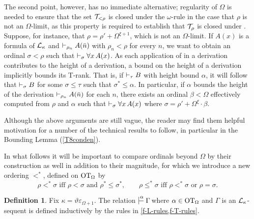 \documentclass[UKenglish,cleveref,DIV=12]{scrartcl}
\theoremstyle{definition}
\newtheorem{definition}[lemma]{Definition}
\theoremstyle{definition}
\begin{document}
The second point, however, has no immediate alternative; regularity
of $\Omega$ is needed to ensure that the set $\mathcal{T}_{<\rho}$ is closed under the $\omega$-rule
in the case that $\rho$ is not an $\Omega$-limit, as this property is required to establish that
$\mathcal{T}_\rho$ is closed under \Conec\eta. 
Suppose, for instance, that 
$\rho=\rho'+\Omega^{\xi+1}$, which is not an $\Omega$-limit. 
If $A(x)$ is a formula of
$\mathcal{L}_\kappa$ and $\vdash_{\rho_n}  A(\bar n)$ with $\rho_n<\rho$ for every
$n$, we want to obtain an ordinal $\sigma<\rho$ such that
$\vdash_\sigma \forall x\, A(x)$.
%
As each application of \Nec\eta{} in a derivation contributes to the height of a
derivation, a bound on the height of a derivation implicitly bounds its T-rank.
That is, if $\vdash_\tau  B$ with height bound $\alpha$, it will follow that 
$\vdash_{\sigma}  B$ for some \( \sigma \le \tau \) such that $\sigma^* \le \alpha $.
In particular, if $\alpha$ bounds the height of the derivation $\vdash_{\rho_n}  A(\bar n)$ for each
$n$, there exists an ordinal \( \beta < \Omega \) effectively computed from \( \rho \) and \( \alpha \)
such that 
$\vdash_\sigma  \forall x\,A(x)$ where 
$\sigma=\rho'+\Omega^\xi\cdot\beta$.

Although the above arguments are still vague, the reader may find them helpful motivation for a number of the technical results to follow, in particular in the Bounding Lemma (\cref{T8conden}).

In what follows it will be important to compare ordinals beyond $\Omega$ by their construction as well in addition to their magnitude, for which we introduce a new ordering $<^*$, defined on $\mathrm{OT}_\Omega$ by
\[
  \rho<^*\sigma \text{ iff }\rho<\sigma \text{ and }\rho^*\le\sigma^*,
  \qquad
  \rho\le^*\sigma \text{ iff } \rho<^*\sigma \text{ or }\rho=\sigma.
\]

\begin{definition}%
Fix $\kappa=\vartheta\varepsilon_{\Omega+1}$. 
The relation $\prv{\alpha}{} \Gamma \! $ where $\alpha \in\mathrm{OT}_\Omega$ and \( \Gamma \) is an \( \mathcal{L}_\kappa \)-sequent is defined inductively by the rules in \cref{f-L-rules,f-T-rules}.
\end{definition}
\end{document}
